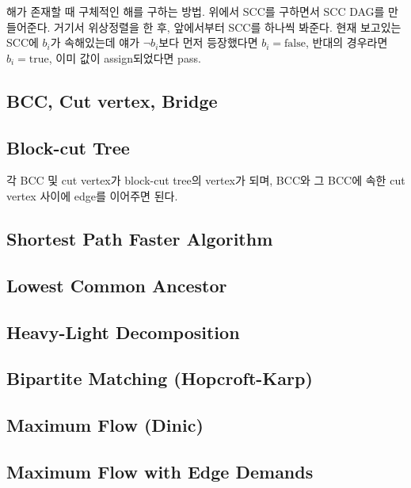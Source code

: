 \documentclass[10pt,landscape,a4paper,twocolumn]{article}
\begin{document}
해가 존재할 때 구체적인 해를 구하는 방법. 위에서 SCC를 구하면서 SCC DAG를 만들어준다. 거기서 위상정렬을 한 후, 앞에서부터 SCC를 하나씩 봐준다. 현재 보고있는 SCC에 $b_{i}$가 속해있는데 얘가 $\neg b_{i}$보다 먼저 등장했다면 $b_{i} = \mathrm{false}$, 반대의 경우라면 $b_{i} = \mathrm{true}$, 이미 값이 assign되었다면 pass.

\subsection{BCC, Cut vertex, Bridge}


\subsection{Block-cut Tree}

각 BCC 및 cut vertex가 block-cut tree의 vertex가 되며, BCC와 그 BCC에 속한 cut vertex 사이에 edge를 이어주면 된다.

\subsection{Shortest Path Faster Algorithm}


\subsection{Lowest Common Ancestor}


\subsection{Heavy-Light Decomposition}


\subsection{Bipartite Matching (Hopcroft-Karp)}


\subsection{Maximum Flow (Dinic)}


\subsection{Maximum Flow with Edge Demands}
\end{document}
